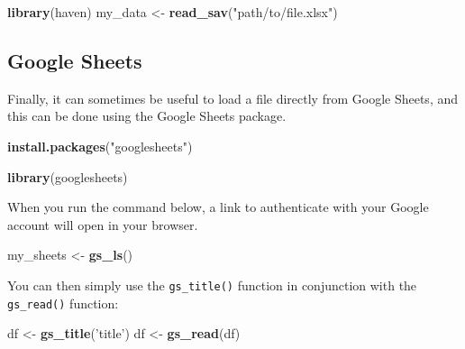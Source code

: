 \documentclass[]{book}
\newenvironment{Shaded}{\begin{snugshade}}{\end{snugshade}}
\newcommand{\KeywordTok}[1]{\textcolor[rgb]{0.13,0.29,0.53}{\textbf{#1}}}
\newcommand{\StringTok}[1]{\textcolor[rgb]{0.31,0.60,0.02}{#1}}
\newcommand{\NormalTok}[1]{#1}
\begin{document}
\begin{Shaded}
\begin{Highlighting}[]
\KeywordTok{library}\NormalTok{(haven)}
\NormalTok{my_data <-}
\StringTok{    }\KeywordTok{read_sav}\NormalTok{(}\StringTok{"path/to/file.xlsx"}\NormalTok{)}
\end{Highlighting}
\end{Shaded}

\subsection{Google Sheets}\label{google-sheets}

Finally, it can sometimes be useful to load a file directly from Google
Sheets, and this can be done using the Google Sheets package.

\begin{Shaded}
\begin{Highlighting}[]
\KeywordTok{install.packages}\NormalTok{(}\StringTok{"googlesheets"}\NormalTok{)}
\end{Highlighting}
\end{Shaded}

\begin{Shaded}
\begin{Highlighting}[]
\KeywordTok{library}\NormalTok{(googlesheets)}
\end{Highlighting}
\end{Shaded}

When you run the command below, a link to authenticate with your Google
account will open in your browser.

\begin{Shaded}
\begin{Highlighting}[]
\NormalTok{my_sheets <-}\StringTok{ }\KeywordTok{gs_ls}\NormalTok{()}
\end{Highlighting}
\end{Shaded}

You can then simply use the \texttt{gs\_title()} function in conjunction
with the \texttt{gs\_read()} function:

\begin{Shaded}
\begin{Highlighting}[]
\NormalTok{df <-}\StringTok{ }\KeywordTok{gs_title}\NormalTok{(}\StringTok{'title'}\NormalTok{)}
\NormalTok{df <-}\StringTok{ }\KeywordTok{gs_read}\NormalTok{(df)}
\end{Highlighting}
\end{Shaded}
\end{document}
